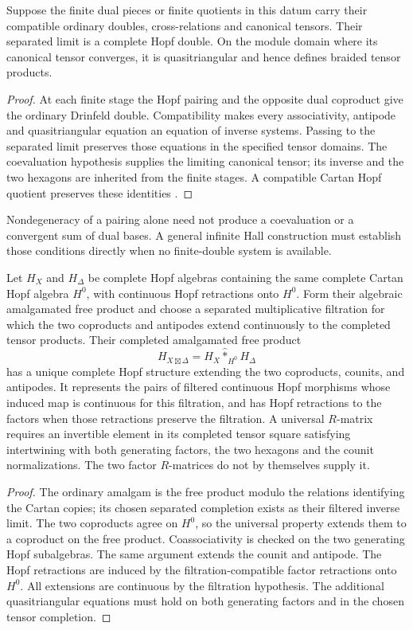 \begin{theorem}
Suppose the finite dual pieces or finite quotients in this datum carry
their compatible ordinary doubles, cross-relations and canonical
tensors. Their separated limit is a complete Hopf double. On the
module domain where its canonical tensor converges, it is
quasitriangular and hence defines braided tensor products.
\end{theorem}
\begin{proof}
At each finite stage the Hopf pairing and the opposite dual coproduct
give the ordinary Drinfeld double. Compatibility makes every
associativity, antipode and quasitriangular equation an equation of
inverse systems. Passing to the separated limit preserves those
equations in the specified tensor domains. The coevaluation hypothesis
supplies the limiting canonical tensor; its inverse and the two
hexagons are inherited from the finite stages. A compatible Cartan
Hopf quotient preserves these identities
\cite{DrinfeldDouble,EtingofSchiffmann,EGNOTensor}.
\end{proof}

Nondegeneracy of a pairing alone need not produce a coevaluation or
a convergent sum of dual bases. A general infinite Hall construction
must establish those conditions directly when no finite-double system
is available.

\begin{theorem}
Let $H_X$ and $H_\Delta$ be complete Hopf algebras containing the same complete Cartan Hopf algebra $H^0$, with continuous Hopf retractions onto $H^0$.  Form their algebraic amalgamated free product and choose a separated
multiplicative filtration for which the two coproducts and antipodes
extend continuously to the completed tensor products. Their completed
amalgamated free product
\[
 H_{X\boxtimes\Delta}
 =H_X\widehat *_{H^0}H_\Delta
\]
has a unique complete Hopf structure extending the two coproducts, counits, and antipodes.  It represents the pairs of filtered continuous Hopf morphisms whose induced map is continuous for this filtration, and has Hopf retractions to the factors when those retractions preserve the filtration.  A universal $R$-matrix requires an invertible element in its completed
tensor square satisfying intertwining with both generating factors,
the two hexagons and the counit normalizations. The two factor
$R$-matrices do not by themselves supply it.
\end{theorem}
\begin{proof}
The ordinary amalgam is the free product modulo the relations
identifying the Cartan copies; its chosen separated completion exists
as their filtered inverse limit.  The two coproducts agree on $H^0$, so the universal property extends them to a coproduct on the free product.  Coassociativity is checked on the two generating Hopf subalgebras.  The same argument extends the counit and antipode.  The Hopf retractions are induced by the filtration-compatible factor retractions onto $H^0$.  All extensions are continuous by the filtration hypothesis.
The additional quasitriangular equations must hold on both generating
factors and in the chosen tensor completion.
\end{proof}

